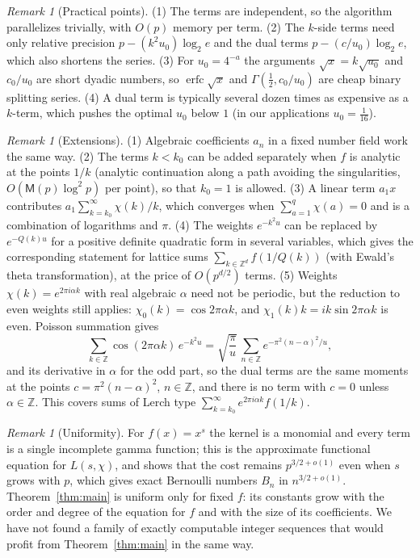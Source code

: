 \documentclass[11pt,reqno]{amsart}
\theoremstyle{definition}
\theoremstyle{remark}
\newtheorem{remark}[theorem]{Remark}
\newcommand{\erfc}{\operatorname{erfc}}
\newcommand{\ZZ}{\mathbb{Z}}
\newcommand{\Mul}{\mathsf{M}}
\begin{document}
\begin{remark}[Practical points]\label{rem:practical}
(1) The terms are independent, so the algorithm parallelizes trivially, with $O(p)$ memory per term. (2) The
$k$-side terms need only relative precision $p - (k^2u_0)\log_2 e$ and the dual terms $p - (c/u_0)\log_2e$,
which also shortens the series. (3) For $u_0 = 4^{-a}$ the arguments $\sqrt x = k\sqrt{u_0}$ and $c_0/u_0$ are
short dyadic numbers, so $\erfc\sqrt x$ and $\Gamma(\frac12, c_0/u_0)$ are cheap binary splitting series. (4) A
dual term is typically several dozen times as expensive as a $k$-term, which pushes the optimal $u_0$ below
$1$ (in our applications $u_0 = \frac1{16}$).
\end{remark}

\begin{remark}[Extensions]\label{rem:ext}
(1) Algebraic coefficients $a_n$ in a fixed number field work the same way. (2) The terms $k < k_0$ can be
added separately when $f$ is analytic at the points $1/k$ (analytic continuation along a path avoiding the
singularities, $O(\Mul(p)\log^2p)$ per point), so that $k_0 = 1$ is allowed. (3) A linear term $a_1 x$ contributes
$a_1\sum_{k=k_0}^{\infty}\chi(k)/k$, which converges when $\sum_{a=1}^{q}\chi(a) = 0$ and is a combination of logarithms and
$\pi$. (4) The weights $e^{-k^2u}$ can be replaced by $e^{-Q(k)u}$ for a positive definite quadratic form in
several variables, which gives the corresponding statement for lattice sums $\sum_{k \in \ZZ^d} f(1/Q(k))$
(with Ewald's theta transformation), at the price of $O(p^{d/2})$ terms. (5) Weights $\chi(k) = e^{2\pi i\alpha k}$
with real algebraic $\alpha$ need not be periodic, but the reduction to even weights still applies:
$\chi_0(k) = \cos 2\pi\alpha k$, and $\chi_1(k)k = i k\sin 2\pi\alpha k$ is even. Poisson summation gives
\[
  \sum_{k\in\ZZ}\cos(2\pi\alpha k)\,e^{-k^2u} = \sqrt{\frac\pi u}\,\sum_{n\in\ZZ}e^{-\pi^2(n-\alpha)^2/u},
\]
and its derivative in $\alpha$ for the odd part, so the dual terms are the same moments at the points $c = \pi^2(n-\alpha)^2$, $n \in \ZZ$, and
there is no term with $c = 0$ unless $\alpha \in \ZZ$. This covers sums of Lerch type $\sum_{k=k_0}^{\infty} e^{2\pi i\alpha k}f(1/k)$.
\end{remark}

\begin{remark}[Uniformity]\label{rem:uniform}
For $f(x) = x^s$ the kernel is a monomial and every term is a single incomplete gamma function; this is the
approximate functional equation for $L(s,\chi)$, and \cite{Joh21} shows that the cost remains
$p^{3/2+o(1)}$ even when $s$ grows with $p$, which gives exact Bernoulli numbers $B_n$ in $n^{3/2+o(1)}$.
Theorem~\ref{thm:main} is uniform only for fixed $f$: its constants grow with the order and degree of the
equation for $f$ and with the size of its coefficients. We have not found a family of exactly computable
integer sequences that would profit from Theorem~\ref{thm:main} in the same way.
\end{remark}
\end{document}
